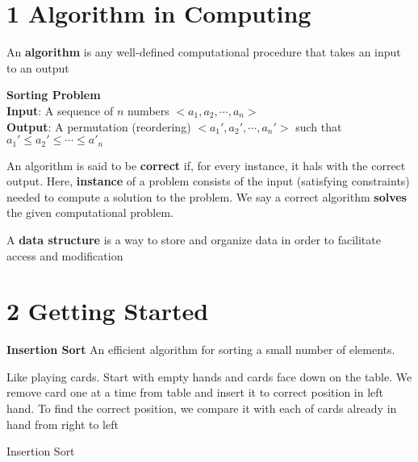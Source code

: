 \documentclass[11pt]{article}
\begin{document}

\section*{1 Algorithm in Computing}

\begin{defn*}
  An \textbf{algorithm} is any well-defined computational procedure that takes an input to an output
\end{defn*}

\begin{defn*}
  \textbf{Sorting Problem}\\
  \textbf{Input}: A sequence of $n$ numbers $<a_1, a_2, \cdots, a_n>$ \\
  \textbf{Output}: A permutation (reordering) $<a_1', a_2', \cdots, a_n'>$ such that $a_1'\leq a_2' \leq \cdots \leq a'_n$
\end{defn*}

\begin{defn*}
  An algorithm is said to be \textbf{correct} if, for every instance, it hals with the correct output. Here, \textbf{instance}  of a problem consists of the input (satisfying constraints) needed to compute a solution to the problem. We say a correct algorithm \textbf{solves} the given computational problem.
\end{defn*}

\begin{defn*}
  A \textbf{data structure} is a way to store and organize data in order to facilitate access and modification
\end{defn*}

\section*{2 Getting Started}

\textbf{Insertion Sort} An efficient algorithm for sorting a small number of elements.

\begin{rem}
  Like playing cards. Start with empty hands and cards face down on the table. We remove card one at a time from table and insert it to correct position in left hand. To find the correct position, we compare it with each of cards already in hand from right to left
\end{rem}


\begin{algorithm}[H]
  \DontPrintSemicolon

  \caption{\sc Insertion Sort}
\end{algorithm}
\end{document}
